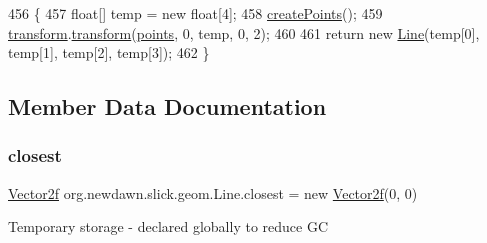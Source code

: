\begin{DoxyCode}
456                                                 \{
457         \textcolor{keywordtype}{float}[] temp = \textcolor{keyword}{new} \textcolor{keywordtype}{float}[4];
458         \mbox{\hyperlink{classorg_1_1newdawn_1_1slick_1_1geom_1_1_line_a3ccc2f47447f307bfcc6b640d03aee9d}{createPoints}}();
459         \mbox{\hyperlink{classorg_1_1newdawn_1_1slick_1_1geom_1_1_line_ac7cb16775d1be4787856682155e872e4}{transform}}.\mbox{\hyperlink{classorg_1_1newdawn_1_1slick_1_1geom_1_1_shape_a463826a085479c379e40f012e970b997}{transform}}(\mbox{\hyperlink{classorg_1_1newdawn_1_1slick_1_1geom_1_1_shape_a8b4d4058734bbb3b96072e470b92aa37}{points}}, 0, temp, 0, 2);
460 
461         \textcolor{keywordflow}{return} \textcolor{keyword}{new} \mbox{\hyperlink{classorg_1_1newdawn_1_1slick_1_1geom_1_1_line_ac9021e18e16cb5a32d0d9f83009c1c0f}{Line}}(temp[0], temp[1], temp[2], temp[3]);
462     \}
\end{DoxyCode}


\subsection{Member Data Documentation}
\mbox{\label{classorg_1_1newdawn_1_1slick_1_1geom_1_1_line_a9ca28ca6a3b18057161bf8cd4c5f2a36}} 
\subsubsection{\texorpdfstring{closest}{closest}}
{\footnotesize\ttfamily \mbox{\hyperlink{classorg_1_1newdawn_1_1slick_1_1geom_1_1_vector2f}{Vector2f}} org.\+newdawn.\+slick.\+geom.\+Line.\+closest = new \mbox{\hyperlink{classorg_1_1newdawn_1_1slick_1_1geom_1_1_vector2f}{Vector2f}}(0, 0)\hspace{0.3cm}{\ttfamily [private]}}

Temporary storage -\/ declared globally to reduce GC \mbox{\label{classorg_1_1newdawn_1_1slick_1_1geom_1_1_line_abc89f3da558e2d29ad48f3c453c25f92}} 
